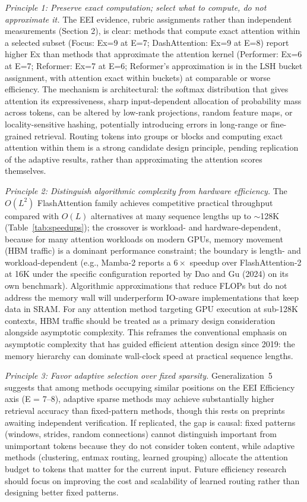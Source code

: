 \documentclass[10pt,twocolumn]{article}
\begin{document}
\textit{Principle 1: Preserve exact computation; select what to compute, do not approximate it.} The EEI evidence, rubric assignments rather than independent measurements (Section 2), is clear: methods that compute exact attention within a selected subset (Focus: Ex=9 at E=7; DashAttention: Ex=9 at E=8) report higher Ex than methods that approximate the attention kernel (Performer: Ex=6 at E=7; Reformer: Ex=7 at E=6; Reformer's approximation is in the LSH bucket assignment, with attention exact within buckets) at comparable or worse efficiency. The mechanism is architectural: the softmax distribution that gives attention its expressiveness, sharp input-dependent allocation of probability mass across tokens, can be altered by low-rank projections, random feature maps, or locality-sensitive hashing, potentially introducing errors in long-range or fine-grained retrieval. Routing tokens into groups or blocks and computing exact attention within them is a strong candidate design principle, pending replication of the adaptive results, rather than approximating the attention scores themselves.

\textit{Principle 2: Distinguish algorithmic complexity from hardware efficiency.} The $O(L^2)$ FlashAttention family achieves competitive practical throughput compared with $O(L)$ alternatives at many sequence lengths up to $\sim$128K (Table~\ref{tab:speedups}); the crossover is workload- and hardware-dependent, because for many attention workloads on modern GPUs, memory movement (HBM traffic) is a dominant performance constraint; the boundary is length- and workload-dependent (e.g., Mamba-2 reports a $6\times$ speedup over FlashAttention-2 at 16K under the specific configuration reported by Dao and Gu (2024) on its own benchmark). Algorithmic approximations that reduce FLOPs but do not address the memory wall will underperform IO-aware implementations that keep data in SRAM. For any attention method targeting GPU execution at sub-128K contexts, HBM traffic should be treated as a primary design consideration alongside asymptotic complexity. This reframes the conventional emphasis on asymptotic complexity that has guided efficient attention design since 2019: the memory hierarchy can dominate wall-clock speed at practical sequence lengths.

\textit{Principle 3: Favor adaptive selection over fixed sparsity.} Generalization~5 suggests that among methods occupying similar positions on the EEI Efficiency axis (E = 7--8), adaptive sparse methods may achieve substantially higher retrieval accuracy than fixed-pattern methods, though this rests on preprints awaiting independent verification. If replicated, the gap is causal: fixed patterns (windows, strides, random connections) cannot distinguish important from unimportant tokens because they do not consider token content, while adaptive methods (clustering, entmax routing, learned grouping) allocate the attention budget to tokens that matter for the current input. Future efficiency research should focus on improving the cost and scalability of learned routing rather than designing better fixed patterns.
\end{document}
